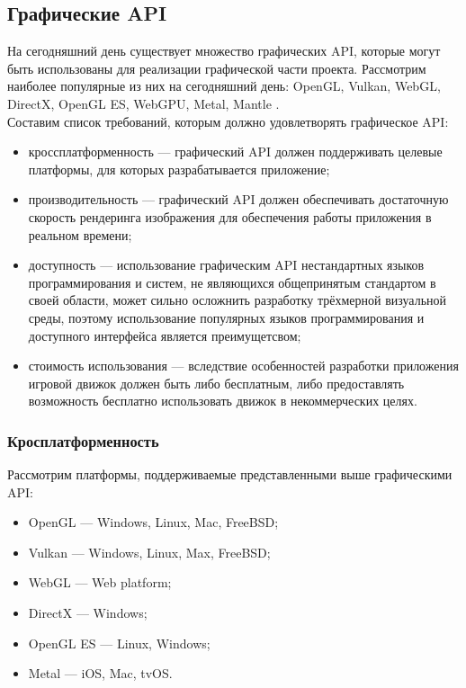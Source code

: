 \subsection{Графические API}
На сегодняшний день существует множество графических API, которые могут быть использованы для реализации графической части проекта. Рассмотрим наиболее популярные из них на сегодняшний день: OpenGL, Vulkan, WebGL, DirectX, OpenGL ES, WebGPU, Metal, Mantle \cite{graph_engine}.\\

Составим список требований, которым должно удовлетворять графическое API:
\begin{itemize}
\item кроссплатформенность --- графический API должен поддерживать целевые платформы, для которых разрабатывается приложение;
\item производительность --- графический API должен обеспечивать достаточную скорость рендеринга изображения для обеспечения работы приложения в реальном времени;
\item доступность --- использование графическим API нестандартных языков программирования и систем, не являющихся общепринятым стандартом в своей области, может сильно осложнить разработку трёхмерной визуальной среды, поэтому использование популярных языков программирования и доступного интерфейса является преимущетсвом;
\item стоимость использования --- вследствие особенностей разработки приложения игровой движок должен быть либо бесплатным, либо предоставлять возможность бесплатно использовать движок в некоммерческих целях.
\end{itemize}

\subsubsection{Кросплатформенность}
Рассмотрим платформы, поддерживаемые представленными выше графическими API:
\begin{itemize}
\item OpenGL --- Windows, Linux, Mac, FreeBSD;
\item Vulkan --- Windows, Linux, Max, FreeBSD;
\item WebGL --- Web platform;
\item DirectX --- Windows;
\item OpenGL ES --- Linux, Windows;
\item Metal --- iOS, Mac, tvOS.
\end{itemize}

